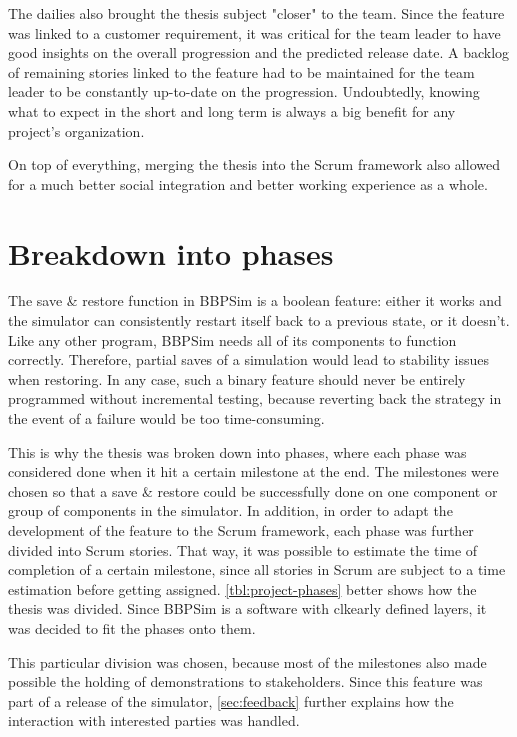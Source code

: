 {The dailies also brought the thesis subject "closer" to the team. Since the feature was linked to a customer requirement, it was critical for the team leader to have good insights on the overall progression and the predicted release date. A backlog of remaining stories linked to the feature had to be maintained for the team leader to be constantly up-to-date on the progression. Undoubtedly, knowing what to expect in the short and long term is always a big benefit for any project's organization. 

On top of everything, merging the thesis into the Scrum framework also allowed for a much better social integration and better working experience as a whole. 

\section{Breakdown into phases}
The save \& restore function in \gls{BBPSim} is a boolean feature: either it works and the simulator can consistently restart itself back to a previous state, or it doesn't. Like any other program, \gls{BBPSim} needs all of its components to function correctly. Therefore, partial saves of a simulation would lead to stability issues when restoring. 
In any case, such a binary feature should never be entirely programmed without incremental testing, because reverting back the strategy in the event of a failure would be too time-consuming.

This is why the thesis was broken down into phases, where each phase was considered done when it hit a certain milestone at the end. The milestones were chosen so that a save \& restore could be successfully done on one component or group of components in the simulator. In addition, in order to adapt the development of the feature to the Scrum framework, each phase was further divided into Scrum stories. That way, it was possible to estimate the time of completion of a certain milestone, since all stories in Scrum are subject to a time estimation before getting assigned. \autoref{tbl:project-phases} better shows how the thesis was divided. Since \gls{BBPSim} is a software with clkearly defined layers, it was decided to fit the phases onto them.

This particular division was chosen, because most of the milestones also made possible the holding of demonstrations to stakeholders. Since this feature was part of a release of the simulator, \autoref{sec:feedback} further explains how the interaction with interested parties was handled.

}
